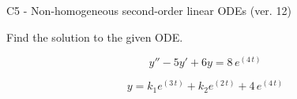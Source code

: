 \begin{exercise}
  \begin{exerciseTitle}C5 - Non-homogeneous second-order linear ODEs (ver. 12)\end{exerciseTitle}
  \begin{exerciseStatement}
    
Find the solution to the given ODE.

    
\[y''-5y'+6y = 8 \, e^{\left(4 \, t\right)}\]

  \end{exerciseStatement}
  \begin{exerciseAnswer}
    
\[y= k_{1} e^{\left(3 \, t\right)} + k_{2} e^{\left(2 \, t\right)} + 4 \, e^{\left(4 \, t\right)}\]

  \end{exerciseAnswer}
\end{exercise}